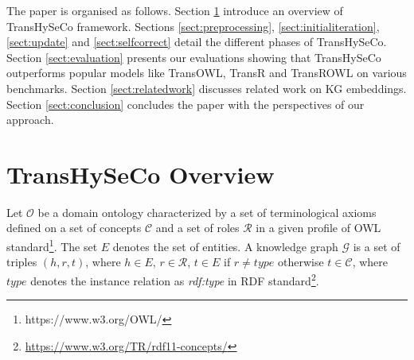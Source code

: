 \documentclass[sigconf]{acmart}
\newcommand{\TransHI}{TransHySeCo\xspace}
\begin{document}
The paper is organised as follows. Section \ref{sect:overview} introduce an overview of \TransHI framework. 
Sections \ref{sect:preprocessing}, \ref{sect:initialiteration}, \ref{sect:update} and \ref{sect:selfcorrect} detail the different phases of \TransHI. Section \ref{sect:evaluation}  presents   our evaluations showing that \TransHI  outperforms popular models like   TransOWL, TransR \cite{transR} and TransROWL \cite{transrowl} on various benchmarks. Section \ref{sect:relatedwork} discusses related work 
on KG embeddings. Section \ref{sect:conclusion} %
concludes the paper with the perspectives of our approach.

\section{\TransHI Overview}
\label{sect:overview}
Let $\mathcal{O}$ be a domain ontology characterized by a set of terminological axioms   defined on a set of concepts $\mathcal{C}$ and a set of roles $\mathcal{R}$ in a given profile of OWL standard\footnote{https://www.w3.org/OWL/}. %
The set $E$ denotes the set of entities. A knowledge graph $\mathcal{G}$ is a set of triples $(h,r,t)$, where $h\in E$, $r\in \mathcal{R}$, $t\in E$ if $r\not= type$ otherwise $t\in \mathcal{C}$, where  $type$ denotes the instance relation  as \textit{rdf:type} in RDF standard\footnote{\url{https://www.w3.org/TR/rdf11-concepts/}}.  
\end{document}
